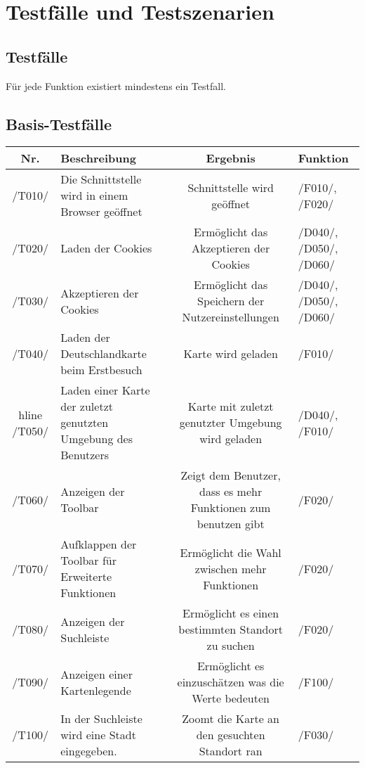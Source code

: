 \section{Testfälle und Testszenarien}
\subsection{Testfälle}

Für jede Funktion existiert mindestens ein Testfall.
\newline
\subsection{Basis-Testfälle}
\begin{tabularx}{\textwidth}{| c | X | c | X |}
    \hline
    \textbf{Nr.} & 
    \textbf{Beschreibung} &
    \textbf{Ergebnis} &
    \textbf{Funktion}\\
    \hline
    /T010/ & Die Schnittstelle wird in einem Browser geöffnet & Schnittstelle wird geöffnet & /F010/, /F020/ \\
    \hline
    /T020/ & Laden der \glspl{Cookie} & Ermöglicht das Akzeptieren der \glspl{Cookie} & /D040/, /D050/, /D060/ \\
    \hline
    /T030/ & Akzeptieren der \glspl{Cookie} & Ermöglicht das Speichern der Nutzereinstellungen & /D040/, /D050/, /D060/ \\
    \hline
    /T040/ & Laden der Deutschlandkarte beim Erstbesuch & Karte wird geladen & /F010/ \\
     hline
    /T050/ & Laden einer Karte der zuletzt genutzten Umgebung des Benutzers & Karte mit zuletzt genutzter Umgebung wird geladen & /D040/, /F010/ \\
    \hline
    /T060/ & Anzeigen der \gls{Toolbar} & Zeigt dem Benutzer, dass es mehr Funktionen zum benutzen gibt & /F020/ \\
    \hline
    /T070/ & Aufklappen der \gls{Toolbar} für Erweiterte Funktionen & Ermöglicht die Wahl zwischen mehr Funktionen & /F020/ \\
    \hline
    /T080/ & Anzeigen der Suchleiste & Ermöglicht es einen bestimmten Standort zu suchen & /F020/ \\
    \hline
    /T090/ & Anzeigen einer Kartenlegende & Ermöglicht es einzuschätzen was die Werte bedeuten & /F100/ \\
    \hline
    /T100/ & In der Suchleiste wird eine Stadt eingegeben. & Zoomt die Karte an den gesuchten Standort ran & /F030/ \\

\end{tabularx}
